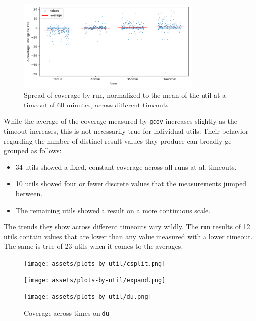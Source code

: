 \documentclass{article}
\begin{document}
\begin{figure}[htbp]
    \centering
    \includegraphics[width=0.8\textwidth]{../plots/gcov_cov/changes-by-time.png}
    \captionsetup{width=0.6\textwidth}
    \caption{Spread of coverage by run, normalized to the mean of the util at a timeout of 60 minutes, across different timeouts}
    \label{fig:spread_across_times_gcov}
\end{figure}

While the average of the coverage measured by \lstinline{gcov} increases slightly as the timeout increases, this is not necessarily true for individual utils. Their behavior regarding the number of distinct result values they produce can broadly ge grouped as follows:

\begin{itemize}
    \item 34 utils showed a fixed, constant coverage across all runs at all timeouts.
    \item 10 utils showed four or fewer discrete values that the measurements jumped between.
    \item The remaining utils showed a result on a more continuous scale.
\end{itemize}

The trends they show across different timeouts vary wildly. The run results of 12 utils contain values that are lower than any value measured with a lower timeout. The same is true of 23 utils when it comes to the averages.

\begin{figure}[htbp]
    \centering
    \begin{minipage}[b]{0.3\linewidth}
        \texttt{[image: assets/plots-by-util/csplit.png]}
        \captionsetup{width=0.9\linewidth}
        \caption{Coverage across times on \lstinline{csplit}}
        \label{fig:cov_csplit}
    \end{minipage}
    \hfill
    \begin{minipage}[b]{0.3\linewidth}
        \texttt{[image: assets/plots-by-util/expand.png]}
        \captionsetup{width=0.9\linewidth}
        \caption{Coverage across times on \lstinline{expand}}
        \label{fig:cov_expand}
    \end{minipage}
    \hfill
    \begin{minipage}[b]{0.3\linewidth}
        \texttt{[image: assets/plots-by-util/du.png]}
        \captionsetup{width=0.9\linewidth}
        \caption{Coverage across times on \lstinline{du}}
        \label{fig:cov_du}
    \end{minipage}
\end{figure}
\end{document}
